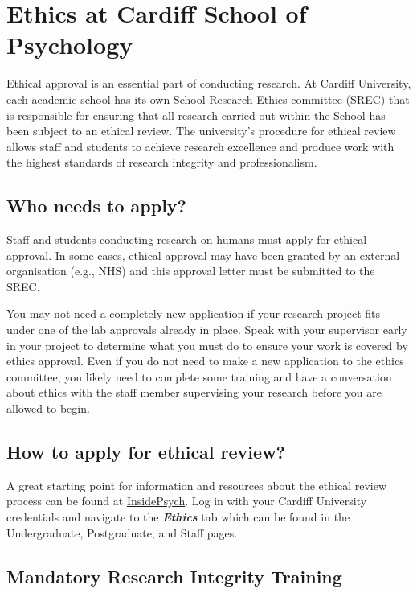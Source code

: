 \documentclass[
  12pt,
]{book}
\begin{document}
\chapter{Ethics at Cardiff School of Psychology}\label{ethics-at-cardiff-school-of-psychology}

Ethical approval is an essential part of conducting research. At Cardiff University, each academic school has its own School Research Ethics committee (SREC) that is responsible for ensuring that all research carried out within the School has been subject to an ethical review. The university's procedure for ethical review allows staff and students to achieve research excellence and produce work with the highest standards of research integrity and professionalism.

\section{Who needs to apply?}\label{who-needs-to-apply}

Staff and students conducting research on humans must apply for ethical approval. In some cases, ethical approval may have been granted by an external organisation (e.g., NHS) and this approval letter must be submitted to the SREC.

You may not need a completely new application if your research project fits under one of the lab approvals already in place. Speak with your supervisor early in your project to determine what you must do to ensure your work is covered by ethics approval. Even if you do not need to make a new application to the ethics committee, you likely need to complete some training and have a conversation about ethics with the staff member supervising your research before you are allowed to begin.

\section{How to apply for ethical review?}\label{how-to-apply-for-ethical-review}

A great starting point for information and resources about the ethical review process can be found at \href{https://inside.psych.cf.ac.uk/}{InsidePsych}. Log in with your Cardiff University credentials and navigate to the \emph{\textbf{Ethics}} tab which can be found in the Undergraduate, Postgraduate, and Staff pages.

\section{Mandatory Research Integrity Training}\label{mandatory-research-integrity-training}
\end{document}
